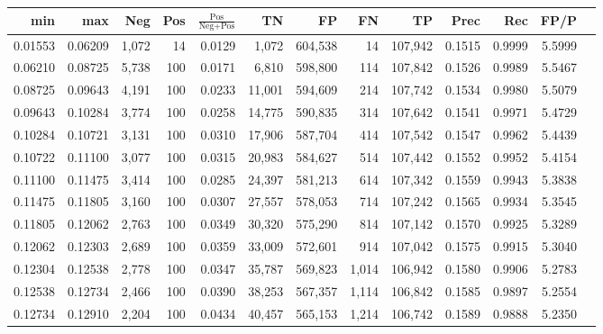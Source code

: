 \begin{tabular}{rrrrrrrrrrrrr}
\toprule
    min &     max &   Neg & Pos & $\frac{\text{Pos}}{\text{Neg}+\text{Pos}}$ &      TN &      FP &      FN &      TP &   Prec &    Rec &   FP/P \\
\midrule
0.01553 & 0.06209 & 1,072 &  14 &                                     0.0129 &   1,072 & 604,538 &      14 & 107,942 & 0.1515 & 0.9999 & 5.5999 \\
0.06210 & 0.08725 & 5,738 & 100 &                                     0.0171 &   6,810 & 598,800 &     114 & 107,842 & 0.1526 & 0.9989 & 5.5467 \\
0.08725 & 0.09643 & 4,191 & 100 &                                     0.0233 &  11,001 & 594,609 &     214 & 107,742 & 0.1534 & 0.9980 & 5.5079 \\
0.09643 & 0.10284 & 3,774 & 100 &                                     0.0258 &  14,775 & 590,835 &     314 & 107,642 & 0.1541 & 0.9971 & 5.4729 \\
0.10284 & 0.10721 & 3,131 & 100 &                                     0.0310 &  17,906 & 587,704 &     414 & 107,542 & 0.1547 & 0.9962 & 5.4439 \\
0.10722 & 0.11100 & 3,077 & 100 &                                     0.0315 &  20,983 & 584,627 &     514 & 107,442 & 0.1552 & 0.9952 & 5.4154 \\
0.11100 & 0.11475 & 3,414 & 100 &                                     0.0285 &  24,397 & 581,213 &     614 & 107,342 & 0.1559 & 0.9943 & 5.3838 \\
0.11475 & 0.11805 & 3,160 & 100 &                                     0.0307 &  27,557 & 578,053 &     714 & 107,242 & 0.1565 & 0.9934 & 5.3545 \\
0.11805 & 0.12062 & 2,763 & 100 &                                     0.0349 &  30,320 & 575,290 &     814 & 107,142 & 0.1570 & 0.9925 & 5.3289 \\
0.12062 & 0.12303 & 2,689 & 100 &                                     0.0359 &  33,009 & 572,601 &     914 & 107,042 & 0.1575 & 0.9915 & 5.3040 \\
0.12304 & 0.12538 & 2,778 & 100 &                                     0.0347 &  35,787 & 569,823 &   1,014 & 106,942 & 0.1580 & 0.9906 & 5.2783 \\
0.12538 & 0.12734 & 2,466 & 100 &                                     0.0390 &  38,253 & 567,357 &   1,114 & 106,842 & 0.1585 & 0.9897 & 5.2554 \\
0.12734 & 0.12910 & 2,204 & 100 &                                     0.0434 &  40,457 & 565,153 &   1,214 & 106,742 & 0.1589 & 0.9888 & 5.2350 \\

\end{tabular}
